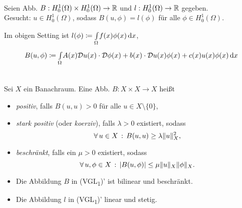 \documentclass{cheat-sheet}
\newcommand{\tss}[1]{\textsubscript{#1}} %
\newcommand{\DO}{\mathcal{D}} %
\begin{document}

\begin{prob} \mbox{} \\
  Seien Abb. $B : H_0^1(\Omega) \times H_0^1(\Omega) \to \mathbb{R}$ und $l : H_0^1(\Omega) \to \mathbb{R}$ gegeben. \\
  Gesucht: $u \in H_0^1(\Omega)$, sodass $B(u, \phi) = l(\phi)$ für alle $\phi \in H_0^1(\Omega)$.
\end{prob}

\begin{bem}
  Im obigen Setting ist \enspace $l(\phi) \coloneqq {\textstyle \int\limits_{\Omega}^{}} f(x) \phi(x) \,\mathrm{d} x$,
  \begin{align*}
    & B(u, \phi) \coloneqq \Int{\Omega}{}{A(x) \DO u(x) \cdot \DO \phi(x) + b(x) \cdot \DO u(x) \phi(x) + c(x) u(x) \phi(x)}{x} \\
    & 
  \end{align*}
\end{bem}

\begin{defn}
  Sei $X$ ein Banachraum.
  Eine Abb. $B : X \times X \to X$ heißt
  \begin{itemize}
    \item \emph{positiv}, falls $B(u, u) > 0$ für alle $u \in X \setminus \{ 0 \}$,
    \item \emph{stark positiv} (oder \emph{koerziv}), falls $\lambda > 0$ existiert, sodass
    \[ \forall \, {u \in X} \,:\, B(u, u) \geq \lambda \lVert u\rVert_X^2, \]
    \item \emph{beschränkt}, falls ein $\mu > 0$ existiert, sodass
    \[ \forall \, {u, \phi \in X} \,:\, \lvert B(u, \phi)\rvert \leq \mu \lVert u\rVert_X \lVert\phi\rVert_X. \]
  \end{itemize}
\end{defn}

\begin{lem}
  \begin{itemize}
    \item Die Abbildung $B$ in (VGL\tss{1})' ist bilinear und beschränkt.
    \item Die Abbildung $l$ in (VGL\tss{1})' linear und stetig.
  \end{itemize}
\end{lem}
\end{document}
